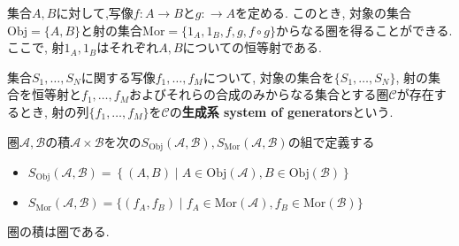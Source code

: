 \begin{Prop}
集合$A,B$に対して,写像$f:A\rightarrow B$と$g:\rightarrow A$を定める.
このとき, 対象の集合$\mathrm{Obj}=\{A,B\}$と射の集合$\mathrm{Mor}=\{1_A,1_B,f,g,f\circ g\}$からなる圏を得ることができる.
ここで, 射$1_A,1_B$はそれぞれ$A,B$についての恒等射である.
\end{Prop}
\begin{comment}
\begin{proof}
\end{proof}
\end{comment}
\begin{Def}
集合$S_1,\dots,S_N$に関する写像$f_1,\dots,f_M$について,
対象の集合を$\{S_1,\dots,S_N\}$,
射の集合を恒等射と$f_1,\dots,f_M$およびそれらの合成のみからなる集合とする圏$\mathscr{C}$が存在するとき, 射の列$\{f_1,\dots,f_M\}$を{$\mathscr{C}$の\bf 生成系 system of generators}という.
\end{Def}
\begin{Def}
圏$\mathscr{A},\mathscr{B}$の積$\mathscr{A}\times\mathscr{B}$を次の$S_{\mathrm{Obj}}\left(\mathscr{A},\mathscr{B}\right),S_{\mathrm{Mor}}\left(\mathscr{A},\mathscr{B}\right)$の組で定義する
\begin{itemize}
\item $S_{\mathrm{Obj}}\left(\mathscr{A},\mathscr{B}\right)
=\left\{(A,B)\mid A\in\mathrm{Obj}(\mathscr{A}),B\in\mathrm{Obj}(\mathscr{B})\right\}$
\item $S_{\mathrm{Mor}}\left(\mathscr{A},\mathscr{B}\right)
=\{(f_A,f_B)\mid f_A\in\mathrm{Mor(\mathscr{A})},
f_B\in\mathrm{Mor(\mathscr{B})}\}$
\end{itemize}
\end{Def}
\begin{Prop}
圏の積は圏である.
\end{Prop}

